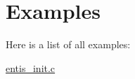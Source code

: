 \section{Examples}
Here is a list of all examples\+:\begin{DoxyCompactItemize}
\item 
\hyperlink{entis_init_8c-example}{entis\+\_\+init.\+c}
\end{DoxyCompactItemize}
